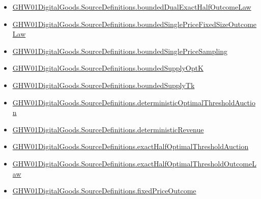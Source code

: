 \documentclass[10pt]{article}
\begin{document}
\begin{itemize}[leftmargin=1.2em]
\begin{itemize}[leftmargin=1.2em]
\item \hyperlink{paper-prerequisite-21da3daea60d6545}{GHW01\allowbreak{}Digital\allowbreak{}Goods.\allowbreak{}Source\allowbreak{}Definitions.\allowbreak{}bounded\allowbreak{}Dual\allowbreak{}Exact\allowbreak{}Half\allowbreak{}Outcome\allowbreak{}Law}
\item \hyperlink{paper-prerequisite-6e59fa6a7ec053ac}{GHW01\allowbreak{}Digital\allowbreak{}Goods.\allowbreak{}Source\allowbreak{}Definitions.\allowbreak{}bounded\allowbreak{}Single\allowbreak{}Price\allowbreak{}Fixed\allowbreak{}Size\allowbreak{}Outcome\allowbreak{}Law}
\item \hyperlink{paper-prerequisite-d8c8e75f6c7cee61}{GHW01\allowbreak{}Digital\allowbreak{}Goods.\allowbreak{}Source\allowbreak{}Definitions.\allowbreak{}bounded\allowbreak{}Single\allowbreak{}Price\allowbreak{}Sampling}
\item \hyperlink{paper-prerequisite-480441cec34ea91d}{GHW01\allowbreak{}Digital\allowbreak{}Goods.\allowbreak{}Source\allowbreak{}Definitions.\allowbreak{}bounded\allowbreak{}Supply\allowbreak{}Opt\allowbreak{}K}
\item \hyperlink{paper-prerequisite-b7f11b9d16845671}{GHW01\allowbreak{}Digital\allowbreak{}Goods.\allowbreak{}Source\allowbreak{}Definitions.\allowbreak{}bounded\allowbreak{}Supply\allowbreak{}Tk}
\item \hyperlink{paper-prerequisite-8b7c5a53e8f8db24}{GHW01\allowbreak{}Digital\allowbreak{}Goods.\allowbreak{}Source\allowbreak{}Definitions.\allowbreak{}deterministic\allowbreak{}Optimal\allowbreak{}Threshold\allowbreak{}Auction}
\item \hyperlink{paper-prerequisite-e3ae90f67eac7771}{GHW01\allowbreak{}Digital\allowbreak{}Goods.\allowbreak{}Source\allowbreak{}Definitions.\allowbreak{}deterministic\allowbreak{}Revenue}
\item \hyperlink{paper-prerequisite-2b5e3b1496d59a63}{GHW01\allowbreak{}Digital\allowbreak{}Goods.\allowbreak{}Source\allowbreak{}Definitions.\allowbreak{}exact\allowbreak{}Half\allowbreak{}Optimal\allowbreak{}Threshold\allowbreak{}Auction}
\item \hyperlink{paper-prerequisite-2e278a88858ccc75}{GHW01\allowbreak{}Digital\allowbreak{}Goods.\allowbreak{}Source\allowbreak{}Definitions.\allowbreak{}exact\allowbreak{}Half\allowbreak{}Optimal\allowbreak{}Threshold\allowbreak{}Outcome\allowbreak{}Law}
\item \hyperlink{paper-prerequisite-2cfbf90ece921554}{GHW01\allowbreak{}Digital\allowbreak{}Goods.\allowbreak{}Source\allowbreak{}Definitions.\allowbreak{}fixed\allowbreak{}Price\allowbreak{}Outcome}

\end{itemize}
\end{itemize}
\end{document}

